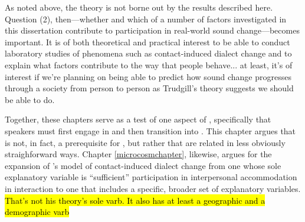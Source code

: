     As noted above, the theory is not borne out by the results described here. Question (2), then---whether and which of a number of factors investigated in this dissertation contribute to participation in real-world sound change---becomes important. It is of both theoretical and practical interest to be able to conduct laboratory studies of phenomena such as contact-induced dialect change and to explain what factors contribute to the way that people behave... at least, it's of interest if we're planning on being able to predict how sound change progresses through a society from person to person as Trudgill's theory suggests we should be able to do.
    
    Together, these chapters serve as a test of one aspect of \cbat{}, specifically that speakers must first engage in \sta{} and then transition into \lta{}. This chapter argues that \sta{} is not, in fact, a prerequisite for \lta{}, but rather that \sla{} are related in less obviously straighforward ways. Chapter \ref{microcosmchapter}, likewise, argues for the expansion of \cbat{}'s model of contact-induced dialect change from one whose sole explanatory variable is ``sufficient'' participation in interpersonal accommodation in interaction to one that includes a specific, broader set of explanatory variables. \hl{That's not his theory's sole varb. It also has at least a geographic and a demographic varb}
    
